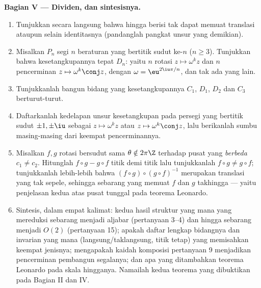 \begin{problem}
\medskip
\noindent\textbf{Bagian V --- Dividen, dan sintesisnya.}
\begin{enumerate}[resume]
  \item Tunjukkan secara langsung bahwa  hingga berisi  tak dapat
        memuat translasi ataupun  selain
        identitasnya (pandanglah pangkat unsur yang
        demikian).
  \item Misalkan $P_n$ segi $n$ beraturan yang bertitik sudut
         ke-$n$ ($n \geq 3$). Tunjukkan bahwa 
        kesetangkupannya tepat $D_n$: yaitu $n$ rotasi $z
        \mapsto \omega^k z$ dan $n$ pencerminan $z \mapsto
        \omega^k \conj z$, dengan $\omega = \eu^{2\iu\pi/n}$, dan tak ada
        yang lain.
  \item Tunjukkanlah bangun bidang yang  kesetangkupannya $C_1$,
        $D_1$, $D_2$ dan $C_3$ berturut-turut.
  \item Daftarkanlah kedelapan unsur  kesetangkupan pada
        persegi yang bertitik sudut $\pm1, \pm\iu$ sebagai  $z \mapsto
        \omega^k z$ atau $z \mapsto \omega^k\conj z$, lalu berikanlah
        sumbu masing-masing dari keempat pencerminannya.
  \item Misalkan $f, g$ rotasi bersudut sama $\theta
        \notin 2\pi\Z$ terhadap pusat yang \emph{berbeda} $c_1 \neq
        c_2$. Hitunglah $f\circ g - g\circ f$ titik demi titik lalu tunjukkanlah
        $f\circ g \neq g\circ f$; tunjukkanlah lebih-lebih bahwa $(f \circ
        g)\circ(g\circ f)^{-1}$ merupakan translasi yang tak sepele, sehingga
        sebarang  yang memuat $f$ dan $g$ takhingga ---
        yaitu penjelasan kedua atas pusat tunggal pada teorema
        Leonardo.
  \item Sintesis, dalam empat kalimat: kedua hasil struktur yang mana
        yang mereduksi  sebarang menjadi aljabar 
        (pertanyaan 3--4) dan  hingga sebarang menjadi
         $O(2)$ (pertanyaan 15); apakah daftar lengkap
         bidangnya dan invarian yang mana
        (langsung/taklangsung, titik tetap) yang memisahkan keempat jenisnya;
        mengapakah kaidah komposisi pertanyaan 9 menjadikan pencerminan
        pembangun segalanya; dan apa yang ditambahkan teorema
        Leonardo pada skala hingganya. Namailah kedua teorema
        yang dibuktikan pada Bagian II dan IV.

\end{enumerate}
\end{problem}

